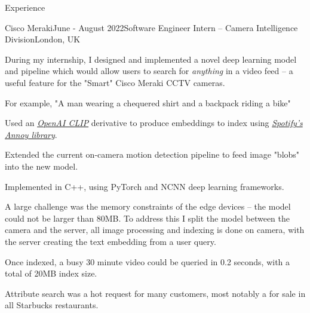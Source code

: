 \documentclass{structure}
\begin{document}
\begin{rSection}{Experience}

\begin{rSubsection}{Cisco Meraki}{June - August 2022}{Software Engineer Intern -- Camera Intelligence Division}{London, UK}{}
    \item During my internship, I designed and implemented a novel deep learning model and pipeline which would allow users 
        to search for \emph{anything} in a video feed -- a useful feature for the "Smart" Cisco Meraki CCTV cameras.
    \item For example, "A man wearing a chequered shirt and a backpack riding a bike"
    \item Used an \emph{\href{https://openai.com/blog/clip/}{OpenAI CLIP}} derivative to produce embeddings
        to index using \emph{\href{https://github.com/spotify/annoy}{Spotify's Annoy library}}.
    \item Extended the current on-camera motion detection pipeline to feed image "blobs" into the new model.
    \item Implemented in C++, using PyTorch and NCNN deep learning frameworks.
    \item A large challenge was the memory constraints of the edge devices -- the model could not be larger than 80MB.
        To address this I split the model between the camera and the server,
        all image processing and indexing is done on camera, with the server creating the text embedding from a user query.
    \item Once indexed, a busy 30 minute video could be queried in 0.2 seconds, with a total of 20MB index size.
    \item Attribute search was a hot request for many customers, most notably a for sale in all Starbucks restaurants.
    \item \href{https://gist.githubusercontent.com/tom-pollak/1a2e8c1fc61ba269e25c73c02c78007c/raw/45c8cbceda8cd745d6d00cb16a09979778df663b/gistfile1.txt}{\color{blue}{Project Reference}}
\end{rSubsection}
\end{rSection}

\end{document}
